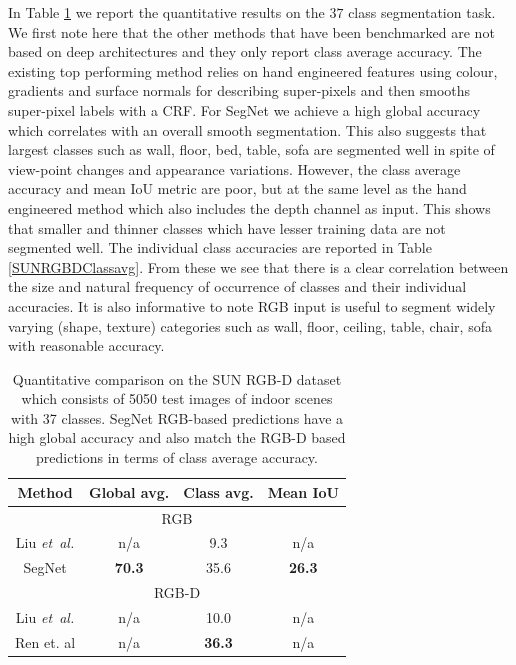 In Table \ref{SUNRGBDtest} we report the quantitative results on the $37$ class segmentation task. We first note here that the other methods that have been benchmarked are not based on deep architectures and they only report class average accuracy. The existing top performing method \citep{ren2012rgb} relies on hand engineered features using colour, gradients and surface normals for describing super-pixels and then smooths super-pixel labels with a CRF. For SegNet we achieve a high global accuracy which correlates with an overall smooth segmentation. This also suggests that largest classes such as wall, floor, bed, table, sofa are segmented well in spite of view-point changes and appearance variations. However, the class average accuracy and mean IoU metric are poor, but at the same level as the hand engineered method which also includes the depth channel as input. This shows that smaller and thinner classes which have lesser training data are not segmented well. The individual class accuracies are reported in Table \ref{SUNRGBDClassavg}. From these we see that there is a clear correlation between the size and natural frequency of occurrence of classes and their individual accuracies. It is also informative to note RGB input is useful to segment widely varying (shape, texture) categories such as wall, floor, ceiling, table, chair, sofa with reasonable accuracy.

\begin{table}[t]
\centering
\begin{tabular}{c|ccc}
{Method} & {Global avg.} & {Class avg.} & {Mean IoU} \\ \hline \hline
\multicolumn{4}{c}{RGB}                                                        \\ \hline
Liu \emph{et~al.}  \citep{SIFT_flow}      & n/a                  & 9.3                & n/a               \\ \hline
SegNet            & \textbf{70.3}                & 35.6               & \textbf{26.3}            \\ \hline
\multicolumn{4}{c}{RGB-D}                                                       \\ \hline
Liu \emph{et~al.}   \citep{SIFT_flow}    & n/a                  & 10.0               & n/a               \\ \hline
Ren et. al \citep{ren2012rgb}     & n/a                  & \textbf{36.3}               & n/a               \\ \hline
\end{tabular}
\caption[SegNet quantitative results on the SUN RGB-D dataset.]{Quantitative comparison on the SUN RGB-D dataset which consists of 5050 test images of indoor scenes with 37 classes. SegNet RGB-based predictions have a high global accuracy and also match the RGB-D based predictions \citep{ren2012rgb} in terms of class average accuracy.}
\label{SUNRGBDtest}
\end{table}

